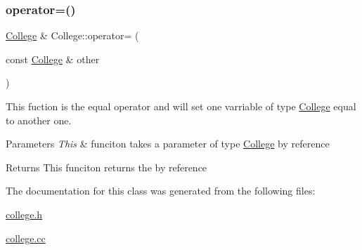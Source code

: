 \subsubsection{\texorpdfstring{operator=()}{operator=()}}
{\footnotesize\ttfamily \hyperlink{classCollege}{College} \& College\+::operator= (\begin{DoxyParamCaption}\item[{const \hyperlink{classCollege}{College} \&}]{other }\end{DoxyParamCaption})}

This fuction is the equal operator and will set one varriable of type \hyperlink{classCollege}{College} equal to another one. 
\begin{DoxyParams}{Parameters}
{\em This} & funciton takes a parameter of type \hyperlink{classCollege}{College} by reference \\
\hline
\end{DoxyParams}
\begin{DoxyReturn}{Returns}
This funciton returns the by reference 
\end{DoxyReturn}


The documentation for this class was generated from the following files\+:\begin{DoxyCompactItemize}
\item 
\hyperlink{college_8h}{college.\+h}\item 
\hyperlink{college_8cc}{college.\+cc}\end{DoxyCompactItemize}
